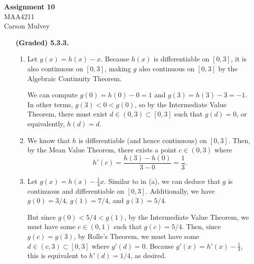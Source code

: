 \documentclass[11pt,letterpaper]{article}
\begin{document}
\begin{center}
    \begin{large}
        \textbf{Assignment 10} \\
        MAA4211 \\
        Carson Mulvey
    \end{large}
\end{center}

\begin{enumerate}
    \item[\textbf{(Graded) 5.3.3.}]
        \begin{enumerate}
            \item Let $g(x) = h(x) - x$. Because $h(x)$ is differentiable on $[0,3]$, it is also continuous on $[0,3]$, making $g$ also continuous on $[0,3]$ by the Algebraic Continuity Theorem.
            
            We can compute $g(0) = h(0) - 0 = 1$ and $g(3) = h(3) - 3 = -1$. In other terms, $g(3) < 0 < g(0)$, so by the Intermediate Value Theorem, there must exist $d\in (0,3) \subset [0,3]$ such that $g(d)=0$, or equivalently, $h(d)=d$.

            \item We know that $h$ is differentiable (and hence continuous) on $[0,3]$. Then, by the Mean Value Theorem, there exists a point $c\in (0,3)$ where
            \[ h'(c) = \frac{h(3)-h(0)}{3-0} = \frac{1}{3}. \]
            
            \item Let $g(x) = h(x) - \frac{1}{4}x$. Similar to in (a), we can deduce that $g$ is continuous and differentiable on $[0,3]$. Additionally, we have $g(0)=3/4$, $g(1)=7/4$, and $g(3)=5/4$.
            
            But since $g(0) < 5/4 < g(1)$, by the Intermediate Value Theorem, we must have some $c\in (0,1)$ such that $g(c)=5/4$. Then, since $g(c)=g(3)$, by Rolle's Theorem, we must have some $d\in (c, 3) \subset [0,3]$ where $g'(d)=0$. Because $g'(x)=h'(x)-\frac{1}{4}$, this is equivalent to $h'(d)=1/4$, as desired.
        \end{enumerate}
\end{enumerate}
\end{document}
